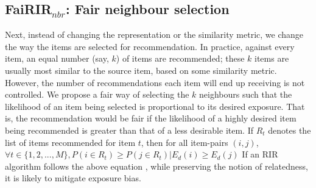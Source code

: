 \subsection{\textbf{FaiRIR$_{nbr}$}: Fair neighbour selection}  \label{sec: Phase 3}

Next, instead of changing the representation or the similarity metric, 
we change the way %
the items are selected for recommendation. %
In practice, against every item, an equal number (say, $k$) of items are recommended; these $k$ items are usually most similar to the source item, based on some similarity metric. 
However, %
the number of recommendations each item will end up receiving is not controlled. 
We propose a fair way of %
selecting the $k$ neighbours %
such that the likelihood of an item being selected is proportional to its desired exposure.
That is, the recommendation would be fair if the likelihood of a highly desired item being recommended %
is greater than that of a less desirable item. If $R_t$ denotes the list of items recommended for item $t$, then for all item-pairs $(i, j)$,
$\forall t \in \{1,2,..., M\}, P(i\in R_t) \geq P(j\in R_t) | E_d(i) \geq E_d(j)
$
\normalsize
If an RIR algorithm follows the above equation%
, while preserving the notion of relatedness, it is likely to 
mitigate exposure bias.

